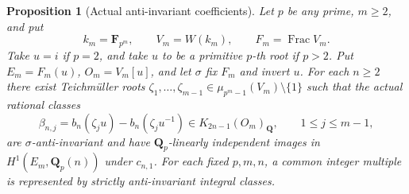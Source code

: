 \documentclass[11pt,a4paper]{article}
\newtheorem{proposition}[theorem]{Proposition}
\theoremstyle{remark}
\newcommand{\Q}{\mathbf Q}
\newcommand{\F}{\mathbf F}
\newcommand{\Frac}{\operatorname{Frac}}
\begin{document}
\begin{proposition}[Actual anti-invariant coefficients]
\label{prop:unramifiedhighercoefficients}
Let $p$ be any prime, $m\geq2$, and put
\[
 k_m=\F_{p^m},\qquad V_m=W(k_m),\qquad F_m=\Frac V_m.
\]
Take $u=i$ if $p=2$, and take $u$ to be a primitive $p$-th root
if $p>2$. Put $E_m=F_m(u)$, $O_m=V_m[u]$, and let $\sigma$
fix $F_m$ and invert $u$.
For each $n\geq2$ there exist Teichm\"uller roots
$\zeta_1,\ldots,\zeta_{m-1}\in\mu_{p^m-1}(V_m)\setminus\{1\}$
such that the actual rational classes
\[
 \beta_{n,j}=b_n(\zeta_ju)-b_n(\zeta_ju^{-1})
 \in K_{2n-1}(O_m)_{\Q},\qquad 1\leq j\leq m-1,
\]
are $\sigma$-anti-invariant and have $\Q_p$-linearly independent
images in $H^1(E_m,\Q_p(n))$ under $c_{n,1}$.
For each fixed $p,m,n$, a common integer multiple is represented
by strictly anti-invariant integral classes.
\end{proposition}
\end{document}
